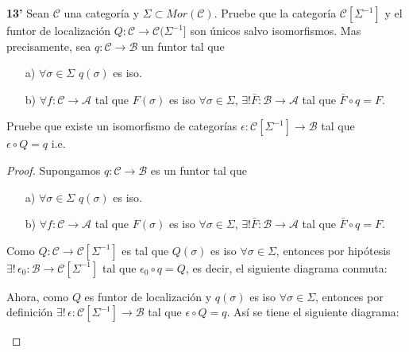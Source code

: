 \documentclass{article}
\begin{document}
\begin{enumerate}
\textbf{13'} Sean $\mathscr{C}$ una categoría y $\Sigma\subset Mor(\mathscr{C})$. Pruebe que la categoría $\mathscr{C}[\Sigma^{-1}]$ y el 
funtor de localización $Q:\mathscr{C}\rightarrow \mathscr{C}(\Sigma^{-1}]$ son únicos salvo isomorfismos. Mas precisamente, sea $q:\mathscr{C}
\rightarrow \mathscr{B}$ un funtor tal que 
\begin{itemize}
\item[a)] $\forall \sigma\in \Sigma$ \quad $q(\sigma)$ es iso.
\item[b)] $\forall f:\mathscr{C}\to \mathscr{A}$ tal que $F(\sigma)$ es iso $\forall \sigma\in \Sigma$, $\exists ! \bar{F}:\mathscr{B}\to\mathscr{A}$
tal que $\bar{F}\circ q=F$.\\
\end{itemize}
Pruebe que existe un isomorfismo de categorías $\epsilon:\mathscr{C}[\Sigma^{-1}]\to \mathscr{B}$ tal que \\$\epsilon\circ Q=q$ \quad i.e. \\
\centerline{
}
\begin{proof}
Supongamos $q:\mathscr{C}\to \mathscr{B}$ es un funtor tal que 
\begin{itemize}
\item[a)] $\forall \sigma\in \Sigma$ \quad $q(\sigma)$ es iso.
\item[b)] $\forall f:\mathscr{C}\to \mathscr{A}$ tal que $F(\sigma)$ es iso $\forall \sigma\in \Sigma$, $\exists ! \bar{F}:\mathscr{B}\to\mathscr{A}$
tal que $\bar{F}\circ q=F$.\\
\end{itemize}

Como $Q:\mathscr{C}\to\mathscr{C}[\Sigma^{-1}]$ es tal que $Q(\sigma)$ es iso $\forall \sigma \in \Sigma$, entonces por 
hipótesis $\exists !\,\epsilon_0:\mathscr{B}\to \mathscr{C}[\Sigma^{-1}]$ tal que $\epsilon_0\circ q=Q$, es decir, el siguiente diagrama conmuta:\\
\centerline{
}
Ahora, como $Q$ es funtor de localización y $q(\sigma)$ es iso $\forall \sigma\in \Sigma$, entonces por definición 
$\exists !\,\epsilon:\mathscr{C}[\Sigma^{-1}]\to \mathscr{B}$ tal que $\epsilon\circ Q=q$. Así se tiene el siguiente diagrama:\\
\centerline{
}


\end{proof}
\end{enumerate}
\end{document}
